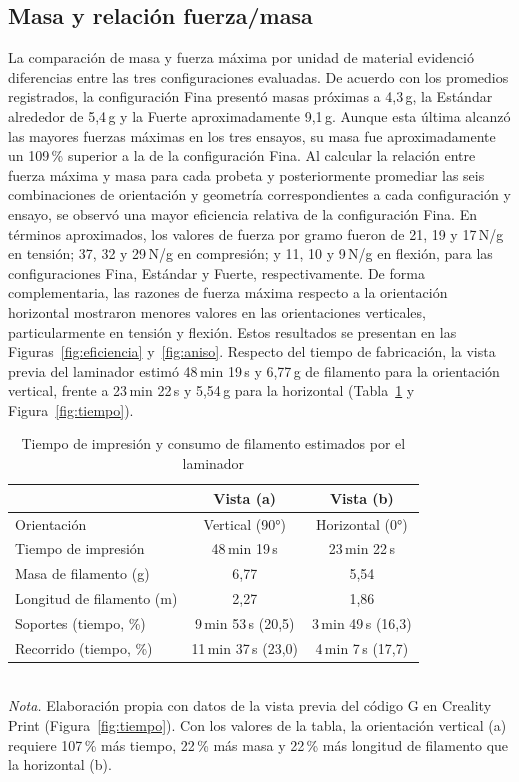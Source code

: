 \documentclass[10pt,twocolumn]{article}
\begin{document}
\subsection{Masa y relación fuerza/masa}
La comparación de masa y fuerza máxima por unidad de material evidenció diferencias entre las tres configuraciones evaluadas. De acuerdo con los promedios registrados, la configuración Fina presentó masas próximas a 4,3\,g, la Estándar alrededor de 5,4\,g y la Fuerte aproximadamente 9,1\,g. Aunque esta última alcanzó las mayores fuerzas máximas en los tres ensayos, su masa fue aproximadamente un 109\,\% superior a la de la configuración Fina. Al calcular la relación entre fuerza máxima y masa para cada probeta y posteriormente promediar las seis combinaciones de orientación y geometría correspondientes a cada configuración y ensayo, se observó una mayor eficiencia relativa de la configuración Fina. En términos aproximados, los valores de fuerza por gramo fueron de 21, 19 y 17\,N/g en tensión; 37, 32 y 29\,N/g en compresión; y 11, 10 y 9\,N/g en flexión, para las configuraciones Fina, Estándar y Fuerte, respectivamente. De forma complementaria, las razones de fuerza máxima respecto a la orientación horizontal mostraron menores valores en las orientaciones verticales, particularmente en tensión y flexión. Estos resultados se presentan en las Figuras~\ref{fig:eficiencia} y~\ref{fig:aniso}. Respecto del tiempo de fabricación, la vista previa del laminador estimó 48\,min 19\,s y 6,77\,g de filamento para la orientación vertical, frente a 23\,min 22\,s y 5,54\,g para la horizontal (Tabla~\ref{tab:tiempo} y Figura~\ref{fig:tiempo}).
\begin{table}[t]
\caption{Tiempo de impresión y consumo de filamento estimados por el laminador}\label{tab:tiempo}
\centering\small
\begin{tabular}{@{}lcc@{}}\toprule
 & Vista (a) & Vista (b)\\\midrule
Orientación & Vertical (90°) & Horizontal (0°)\\
Tiempo de impresión & 48\,min 19\,s & 23\,min 22\,s\\
Masa de filamento (g) & 6{,}77 & 5{,}54\\
Longitud de filamento (m) & 2{,}27 & 1{,}86\\
Soportes (tiempo, \%) & 9\,min 53\,s (20{,}5) & 3\,min 49\,s (16{,}3)\\
Recorrido (tiempo, \%) & 11\,min 37\,s (23{,}0) & 4\,min 7\,s (17{,}7)\\\bottomrule
\end{tabular}\\[2pt]
\footnotesize\textit{Nota.} Elaboración propia con datos de la vista previa del código G en Creality Print (Figura~\ref{fig:tiempo}). Con los valores de la tabla, la orientación vertical (a) requiere 107\,\% más tiempo, 22\,\% más masa y 22\,\% más longitud de filamento que la horizontal (b).
\end{table}
\end{document}
